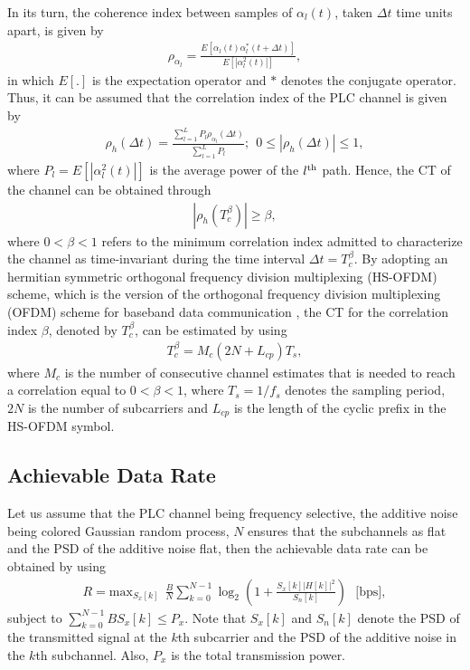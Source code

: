 \documentclass[journal]{IEEEtran}
\begin{document}
In its turn, the coherence index between samples of $\alpha_l(t)$, taken $\Delta t$ time units apart, is given by
\begin{eqnarray}\label{eq-correlindex}
\rho_{\alpha_l}=\frac{E[\alpha_l(t)\alpha^*_l(t+\Delta t)]}{E[|\alpha_l^2(t)|]},
\end{eqnarray}
in which $E[.]$ is the expectation operator and $*$ denotes the conjugate operator. 
Thus, it can be assumed that the correlation index of the PLC channel is given by
\begin{eqnarray}\label{eq-correl}
\rho_{h}(\Delta t)=\frac{\sum_{l=1}^L P_l \rho_{\alpha_l}(\Delta t)}{\sum_{l=1}^L P_l}; \ \ 0\leq |\rho_h(\Delta t)|\leq 1,
\end{eqnarray}
where $P_l= E[|\alpha_l^2(t)|]$ is the average power of the  $l^{\rm th}$ path. Hence, the CT of the channel can be obtained through
\begin{eqnarray}\label{eq-correlfinal}
|\rho_h(T_c^{\beta})|\geq \beta,
\end{eqnarray}
where $0 <\beta < 1$ refers to the minimum correlation index admitted to characterize the channel as time-invariant during the time interval $\Delta t =T_c^{\beta}$. By adopting an hermitian symmetric orthogonal frequency division multiplexing (HS-OFDM) scheme, which is the version of the orthogonal frequency division multiplexing (OFDM) scheme for baseband data communication \cite{Ribeiro2014a}, the CT for the correlation index $\beta$, denoted by $T_{c}^{\beta}$, can be estimated by using~\cite{Picorone2014} 
\begin{eqnarray}
	T_{c}^{\beta} = M_c(2N+L_{cp})T_s,
\end{eqnarray}
where $M_c$ is the number of consecutive channel estimates that is needed to reach a correlation equal to $0<\beta<1$, where
$T_s=1/f_s$ denotes the sampling period, $2N$ is the number of subcarriers and $L_{cp}$ is the length of the cyclic prefix in the HS-OFDM symbol.

\subsection{Achievable Data Rate}

Let us assume that the PLC channel being frequency selective, the additive noise being colored Gaussian random process, $N$ ensures that the subchannels as flat and the \ac{PSD} of the additive noise flat, then the achievable data rate can be obtained by using \cite{Cover2006}
\begin{eqnarray} \label{eq-txMedia}
R = \mbox{max}_{S_x[k]} \ \ \frac{B}{N}\sum_{k=0}^{N-1}\log_2\left(1+ \frac{S_x[k]|H[k]|^2}{S_n[k]}\right)\ \ \ \mbox{[bps]},
\end{eqnarray}
subject to $\sum_{k=0}^{N-1} BS_x[k] \leq P_x$. Note that $S_x[k]$ and  $S_n[k]$ denote the \ac{PSD} of the transmitted signal at the $k$th subcarrier and the \ac{PSD} of the additive noise in the $k$th subchannel. Also, $P_x$ is the total transmission power.
\end{document}
